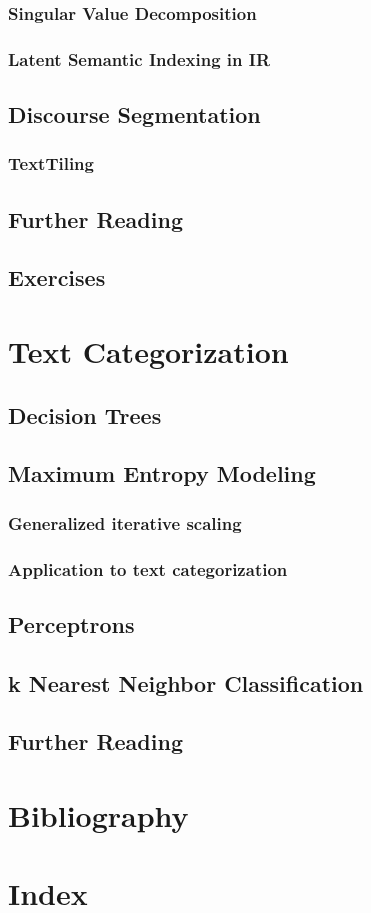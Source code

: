 \documentclass[a4paper]{article}
\begin{document}
\subsubsection{Singular Value Decomposition}
\subsubsection{Latent Semantic Indexing in IR}
\subsection{Discourse Segmentation}
\subsubsection{TextTiling}
\subsection{Further Reading}
\subsection{Exercises}
\newpage
\section{Text Categorization}
\subsection{Decision Trees}
\subsection{Maximum Entropy Modeling}
\subsubsection{Generalized iterative scaling}
\subsubsection{Application to text categorization}
\subsection{Perceptrons}
\subsection{k Nearest Neighbor Classification}
\subsection{Further Reading}
\section*{Bibliography}
\section*{Index}
\end{document}
